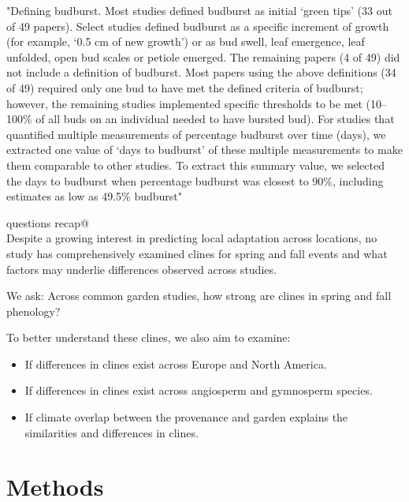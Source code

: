 \documentclass{article}
\begin{document}
"Defining budburst. Most studies defined budburst as initial ‘green tips’ (33 out of
49 papers). Select studies defined budburst as a specific increment of growth (for
example, ‘0.5 cm of new growth’) or as bud swell, leaf emergence, leaf unfolded,
open bud scales or petiole emerged. The remaining papers (4 of 49) did not
include a definition of budburst. Most papers using the above definitions (34 of 49)
required only one bud to have met the defined criteria of budburst; however, the
remaining studies implemented specific thresholds to be met (10–100\% of all buds
on an individual needed to have bursted bud). For studies that quantified multiple
measurements of percentage budburst over time (days), we extracted one value of
‘days to budburst’ of these multiple measurements to make them comparable to
other studies. To extract this summary value, we selected the days to budburst when
percentage budburst was closest to 90\%, including estimates as low as 49.5\% budburst"

\verb@Research questions recap@
\\
Despite a growing interest in predicting local adaptation across locations, no study has comprehensively examined clines for spring and fall events and what factors may underlie differences observed across studies.

We ask: Across common garden studies, how strong are clines in spring and fall phenology?

To better understand these clines, we also aim to examine:
\begin{itemize}
\item If differences in clines exist across Europe and North America.
\item If differences in clines exist across angiosperm and gymnosperm species.
\item If climate overlap between the provenance and garden explains the similarities and differences in clines.
\end{itemize}

\section{Methods}
\end{document}
